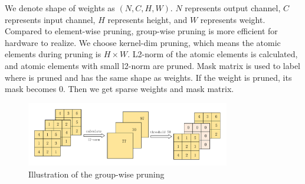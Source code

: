 We denote shape of weights as $(N, C, H, W)$. $N$ represents output channel, $C$ represents input channel, $H$ represents height, and $W$ represents weight. Compared to element-wise pruning, group-wise pruning is more efficient for hardware to realize. We choose kernel-dim pruning, which means the atomic elements during pruning is $H \times W$. L2-norm of the atomic elements is calculated, and atomic elements with small l2-norm are pruned. Mask matrix is used to label where is pruned and has the same shape as weights. If the weight is pruned, its mask becomes 0. Then we get sparse weights and mask matrix. 

\begin{figure}[tb]
    \centering\includegraphics[width=3.5in]{figures/prune-light.pdf}
    \caption{Illustration of the group-wise pruning}\label{fig:prune}
\end{figure}

